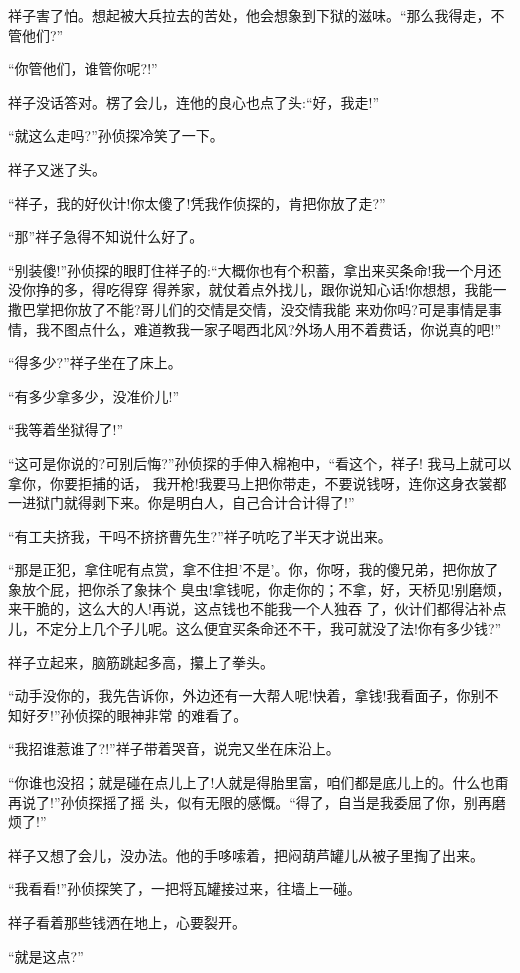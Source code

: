 \documentclass[11pt,a4paper,onecolumn]{article}
\begin{document}
祥子害了怕。想起被大兵拉去的苦处，他会想象到下狱的滋味。``那么我得走，不管他们?''

``你管他们，谁管你呢?!''

祥子没话答对。楞了会儿，连他的良心也点了头:``好，我走!''

``就这么走吗?''孙侦探冷笑了一下。

祥子又迷了头。

``祥子，我的好伙计!你太傻了!凭我作侦探的，肯把你放了走?''

``那\myrule ''祥子急得不知说什么好了。

``别装傻!''孙侦探的眼盯住祥子的:``大概你也有个积蓄，拿出来买条命!我一个月还没你挣的多，得吃得穿
得养家，就仗着点外找儿，跟你说知心话!你想想，我能一撒巴掌把你放了不能?哥儿们的交情是交情，没交情我能
来劝你吗?可是事情是事情，我不图点什么，难道教我一家子喝西北风?外场人用不着费话，你说真的吧!''

``得多少?''祥子坐在了床上。

``有多少拿多少，没准价儿!''

``我等着坐狱得了!''

``这可是你说的?可别后悔?''孙侦探的手伸入棉袍中，``看这个，祥子! 我马上就可以拿你，你要拒捕的话，
我开枪!我要马上把你带走，不要说钱呀，连你这身衣裳都一进狱门就得剥下来。你是明白人，自己合计合计得了!''

``有工夫挤我，干吗不挤挤曹先生?''祥子吭吃了半天才说出来。

``那是正犯，拿住呢有点赏，拿不住担'不是'。你，你呀，我的傻兄弟，把你放了象放个屁，把你杀了象抹个
臭虫!拿钱呢，你走你的；不拿，好，天桥见!别磨烦，来干脆的，这么大的人!再说，这点钱也不能我一个人独吞
了，伙计们都得沾补点儿，不定分上几个子儿呢。这么便宜买条命还不干，我可就没了法!你有多少钱?''

祥子立起来，脑筋跳起多高，攥上了拳头。

``动手没你的，我先告诉你，外边还有一大帮人呢!快着，拿钱!我看面子，你别不知好歹!''孙侦探的眼神非常
的难看了。

``我招谁惹谁了?!''祥子带着哭音，说完又坐在床沿上。

``你谁也没招；就是碰在点儿上了!人就是得胎里富，咱们都是底儿上的。什么也甭再说了!''孙侦探摇了摇
头，似有无限的感慨。``得了，自当是我委屈了你，别再磨烦了!''

祥子又想了会儿，没办法。他的手哆嗦着，把闷葫芦罐儿从被子里掏了出来。

``我看看!''孙侦探笑了，一把将瓦罐接过来，往墙上一碰。

祥子看着那些钱洒在地上，心要裂开。

``就是这点?''
\end{document}
